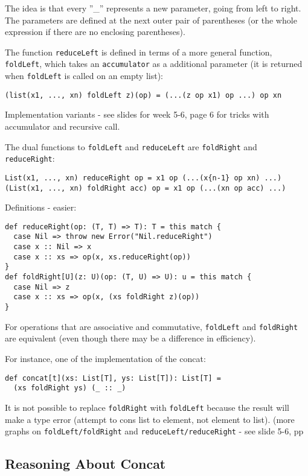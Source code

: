 \documentclass{scrartcl}
\newcommand{\term}[1]{\verb~#1~} %
\begin{document}
The idea is that every ''\_'' represents a new parameter, going from left to
right. The parameters are defined at the next outer pair of parentheses (or the
whole expression if there are no enclosing parentheses).

The function \lstinline|reduceLeft| is defined in terms of a more general
function, \lstinline|foldLeft|, which takes an \term{accumulator} as a
additional parameter (it is returned when \lstinline|foldLeft| is called on an
empty list):
\begin{lstlisting}
(list(x1, ..., xn) foldLeft z)(op) = (...(z op x1) op ...) op xn
\end{lstlisting}
Implementation variants - see slides for week 5-6, page 6 for tricks with
accumulator and recursive call.

The dual functions to \lstinline|foldLeft| and \lstinline|reduceLeft| are
\lstinline|foldRight| and \lstinline|reduceRight|:
\begin{lstlisting}
List(x1, ..., xn) reduceRight op = x1 op (...(x{n-1} op xn) ...)
(List(x1, ..., xn) foldRight acc) op = x1 op (...(xn op acc) ...)
\end{lstlisting}
Definitions - easier:
\begin{lstlisting}
def reduceRight(op: (T, T) => T): T = this match {
  case Nil => throw new Error("Nil.reduceRight")
  case x :: Nil => x
  case x :: xs => op(x, xs.reduceRight(op))
}
def foldRight[U](z: U)(op: (T, U) => U): u = this match {
  case Nil => z
  case x :: xs => op(x, (xs foldRight z)(op))
}
\end{lstlisting}
For operations that are associative and commutative, \lstinline|foldLeft| and
\lstinline|foldRight| are equivalent (even though there may be a difference in
efficiency). 

For instance, one of the implementation of the concat:
\begin{lstlisting}
def concat[t](xs: List[T], ys: List[T]): List[T] =
  (xs foldRight ys) (_ :: _)
\end{lstlisting}
It is not possible to replace \lstinline|foldRight| with \lstinline|foldLeft|
because the result will make a type error (attempt to cons list to element, not
element to list).
(more graphs on \lstinline|foldLeft/foldRight| and
\lstinline|reduceLeft/reduceRight| - see slide 5-6, pp 

\subsection{Reasoning About Concat}
\label{sec:Concat}
\end{document}
